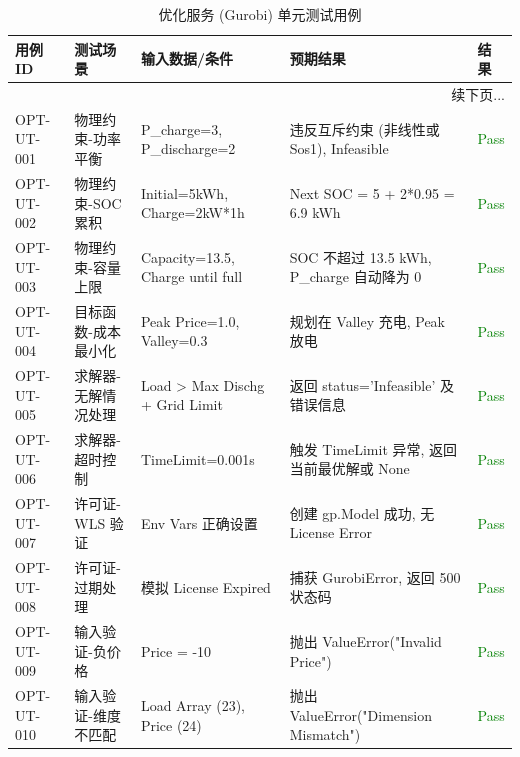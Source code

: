 \begin{longtable}{|p{2.5cm}|p{4cm}|p{4cm}|p{3.5cm}|p{1.5cm}|}
    \caption{优化服务 (Gurobi) 单元测试用例}                                                                                                    \\
    \hline
    \textbf{用例 ID} & \textbf{测试场景} & \textbf{输入数据/条件}                 & \textbf{预期结果}                       & \textbf{结果}             \\ \hline
    \endfirsthead
    \hline
    \multicolumn{5}{|r|}{续下页...}                                                                                                      \\ \hline
    \endfoot
    \hline
    \endlastfoot

    OPT-UT-001     & 物理约束-功率平衡     & P\_charge=3, P\_discharge=2      & 违反互斥约束 (非线性或 Sos1), Infeasible      & \textcolor{green}{Pass} \\ \hline
    OPT-UT-002     & 物理约束-SOC 累积   & Initial=5kWh, Charge=2kW*1h      & Next SOC = 5 + 2*0.95 = 6.9 kWh     & \textcolor{green}{Pass} \\ \hline
    OPT-UT-003     & 物理约束-容量上限     & Capacity=13.5, Charge until full & SOC 不超过 13.5 kWh, P\_charge 自动降为 0  & \textcolor{green}{Pass} \\ \hline
    OPT-UT-004     & 目标函数-成本最小化    & Peak Price=1.0, Valley=0.3       & 规划在 Valley 充电, Peak 放电              & \textcolor{green}{Pass} \\ \hline
    OPT-UT-005     & 求解器-无解情况处理    & Load > Max Dischg + Grid Limit   & 返回 status='Infeasible' 及错误信息        & \textcolor{green}{Pass} \\ \hline
    OPT-UT-006     & 求解器-超时控制      & TimeLimit=0.001s                 & 触发 TimeLimit 异常, 返回当前最优解或 None      & \textcolor{green}{Pass} \\ \hline
    OPT-UT-007     & 许可证-WLS 验证    & Env Vars 正确设置                    & 创建 gp.Model 成功, 无 License Error     & \textcolor{green}{Pass} \\ \hline
    OPT-UT-008     & 许可证-过期处理      & 模拟 License Expired               & 捕获 GurobiError, 返回 500 状态码          & \textcolor{green}{Pass} \\ \hline
    OPT-UT-009     & 输入验证-负价格      & Price = -10                      & 抛出 ValueError("Invalid Price")      & \textcolor{green}{Pass} \\ \hline
    OPT-UT-010     & 输入验证-维度不匹配    & Load Array (23), Price (24)      & 抛出 ValueError("Dimension Mismatch") & \textcolor{green}{Pass} \\ \hline
\end{longtable}

